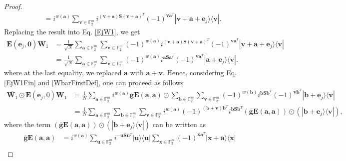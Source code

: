 \documentclass[lettersize,journal,onecolumn]{IEEEtran}
\begin{document}
\begin{proof}
\begin{align*}
	& = i^{w(\mathbf{a})} \sum_{\mathbf{v} \in \mathbb{F}_2^m}{i^{(\mathbf{v+a})\mathbf{S}(\mathbf{v+a})^T}(-1)^{\mathbf{v}\mathbf{a}^T} |\mathbf{v+a}+\mathbf{e}_j \rangle  \langle \mathbf{v}|}.
\end{align*}
Replacing the result into Eq. \eqref{EjW1}, we get
\begin{align}
	\mathbf{E}(\mathbf{e}_j, \mathbf{0})\mathbf{W}_1 &= \frac{1}{\sqrt{N}}  \sum_{\mathbf{a} \in \mathbb{F}_2^m}{\sum_{\mathbf{v} \in \mathbb{F}_2^m}{ (-1)^{w(\mathbf{a})} i^{(\mathbf{v+a})\mathbf{S}(\mathbf{v+a})^T}(-1)^{\mathbf{v}\mathbf{a}^T} |\mathbf{v+a}+\mathbf{e}_j \rangle  \langle \mathbf{v}|}} \nonumber \\
	& = \frac{1}{\sqrt{N}}  \sum_{\mathbf{a} \in \mathbb{F}_2^m}{\sum_{\mathbf{v} \in \mathbb{F}_2^m}{ (-1)^{w(\mathbf{a})} i^{\mathbf{a}\mathbf{S}\mathbf{a}^T}(-1)^{\mathbf{v}\mathbf{a}^T} |\mathbf{a}+\mathbf{e}_j \rangle  \langle \mathbf{v}|}} \label{EjW1Fin}.
\end{align}
where at the last equality, we replaced $\mathbf{a}$ with $\mathbf{a+v}$. Hence, considering Eq. \eqref{EjW1Fin} and \eqref{WbarFirstDef}, one can proceed as follows
\begin{align}
	\overline{\mathbf{W}_1} \odot \mathbf{E}(\mathbf{e}_j, 0)\mathbf{W}_1& = \frac{1}{N} \sum_{\mathbf{a} \in \mathbb{F}^m_2} i^{w(\mathbf{a})}\overline{\mathbf{g}}\mathbf{E}(\mathbf{a},\mathbf{a})\odot \sum_{\mathbf{b} \in \mathbb{F}_2^m}{\sum_{\mathbf{v} \in \mathbb{F}_2^m}{ (-1)^{w(\mathbf{b})} i^{\mathbf{b}\mathbf{S}\mathbf{b}^T}(-1)^{\mathbf{v}\mathbf{b}^T} |\mathbf{b}+\mathbf{e}_j \rangle  \langle \mathbf{v}|}} \nonumber \\
	&=\frac{1}{N} \sum_{\mathbf{a} \in \mathbb{F}^m_2}{\sum_{\mathbf{b} \in \mathbb{F}_2^m}{\sum_{\mathbf{v} \in \mathbb{F}_2^m}}i^{w(\mathbf{a})}(-1)^{(\mathbf{b+v})\mathbf{b}^T}  i^{\mathbf{b}\mathbf{S}\mathbf{b}^T} (\overline{\mathbf{g}}\mathbf{E}(\mathbf{a},\mathbf{a}))\odot (|\mathbf{b}+\mathbf{e}_j \rangle  \langle \mathbf{v}|) }, \label{midlWbarEjWFirst}
\end{align}
where the term $\left( \overline{\mathbf{g}}\mathbf{E}\left(\mathbf{a},\mathbf{a}\right) \right)\odot \left( |\mathbf{b}+\mathbf{e}_j \rangle  \langle \mathbf{v}| \right)$ can be written as 
\begin{align}
	\overline{\mathbf{g}}\mathbf{E}(\mathbf{a},\mathbf{a}) &=i^{w(\mathbf{a})} \sum_{\mathbf{u} \in \mathbb{F}_2^m}{i^{-\mathbf{u S}\mathbf{u}^T} |\mathbf{u} \rangle  \langle \mathbf{u}|}\sum_{\mathbf{x} \in \mathbb{F}_2^m}{ (-1)^{\mathbf{x}\mathbf{a}^T}|\mathbf{x+a} \rangle  \langle \mathbf{x}|} \nonumber \\

\end{align}
\end{proof}
\end{document}

